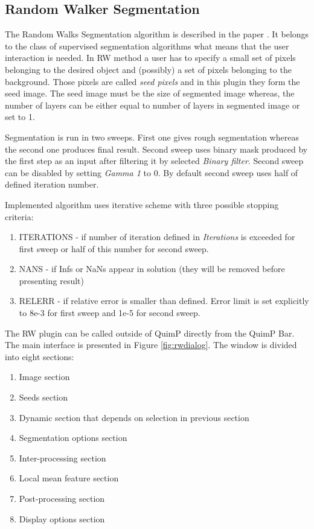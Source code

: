 \documentclass[a4paper,12pt]{article}
\begin{document}
\subsection{Random Walker Segmentation}
\label{sec:RWSeg}
The Random Walks Segmentation algorithm is described in the paper \cite{Grady2006}. It belongs to the class of supervised segmentation algorithms what means that the user interaction is needed. In RW method a user has to specify a small set of pixels belonging to the desired object and (possibly) a set of pixels belonging to the background. Those pixels are called \textit{seed pixels} and in this plugin they form the seed image. The seed image must be the size of segmented image whereas, the number of layers can be either equal to number of layers in segmented image or set to 1. 

Segmentation is run in two sweeps. First one gives rough segmentation whereas the second one produces final result. Second sweep uses binary mask produced by the first step as an input after filtering it by selected \textit{Binary filter}. Second sweep can be disabled by setting \textit{Gamma 1} to 0. By default second sweep uses half of defined iteration number.

Implemented algorithm uses iterative scheme with three possible stopping criteria:
\begin{enumerate}
	\item ITERATIONS - if number of iteration defined in \textit{Iterations} is exceeded for first sweep or half of this number for second sweep.
	\item NANS - if Infs or NaNs appear in solution (they will be removed before presenting result)
	\item RELERR - if relative error is smaller than defined. Error limit is set explicitly to 8e-3 for first sweep and 1e-5 for second sweep.
\end{enumerate}

The RW plugin can be called outside of QuimP directly from the QuimP Bar. The main interface is presented in Figure \ref{fig:rwdialog}. The window is divided into eight sections:
\begin{enumerate}
	\item Image section
	\item Seeds section
	\item Dynamic section that depends on selection in previous section
	\item Segmentation options section
	\item Inter-processing section
	\item Local mean feature section
	\item Post-processing section
	\item Display options section
\end{enumerate}
\end{document}
